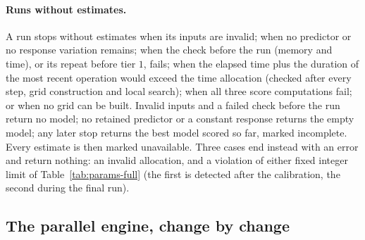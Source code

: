 \paragraph{Runs without estimates.} A run stops without estimates when its inputs are invalid; when no predictor or no
response variation remains; when the check before the run (memory and time), or its repeat before tier $1$, fails; when
the elapsed time plus the duration of the most recent operation would exceed the time allocation (checked after every
step, grid construction and local search); when all three score computations fail; or when no grid can be built.
Invalid inputs and a failed check before the run return no model; no retained predictor or a constant response returns
the empty model; any later stop returns the best model scored so far, marked incomplete. Every estimate is then marked
unavailable. Three cases end instead with an error and return nothing: an invalid allocation, and a violation of either
fixed integer limit of Table~\ref{tab:params-full} (the first is detected after the calibration, the second during the final
run).


\subsection{The parallel engine, change by change}\label{app:engine}

